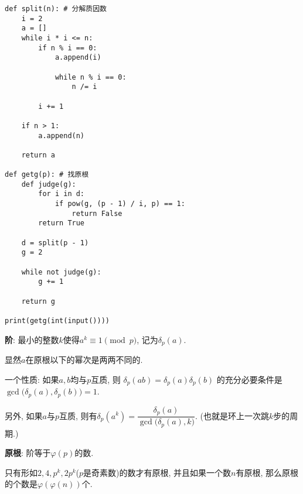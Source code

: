 \begin{verbatim}
def split(n): # 分解质因数
    i = 2
    a = []
    while i * i <= n:
        if n % i == 0:
            a.append(i)

            while n % i == 0:
                n /= i

        i += 1

    if n > 1:
        a.append(n)

    return a
    
def getg(p): # 找原根
    def judge(g):
        for i in d:
            if pow(g, (p - 1) / i, p) == 1:
                return False
        return True

    d = split(p - 1)
    g = 2

    while not judge(g):
        g += 1

    return g

print(getg(int(input())))
\end{verbatim}

\textbf{阶}: 最小的整数$k$使得$a ^ k \equiv 1 \pmod p$, 记为$\delta_p(a)$.

显然$a$在原根以下的幂次是两两不同的.

一个性质: 如果$a, b$均与$p$互质, 则 $ \delta_p(ab)=\delta_p(a)\delta_p(b) $ 的充分必要条件是$ \gcd\big(\delta_p(a),\delta_p(b)\big)=1 $.

另外, 如果$a$与$p$互质, 则有$ \delta_p(a^k)=\dfrac{\delta_p(a)}{\gcd\big(\delta_p(a),k\big)} $. (也就是环上一次跳$k$步的周期.)

\textbf{原根}: 阶等于$\varphi(p)$的数.

只有形如$2, 4, p ^ k, 2 p ^ k$($p$是奇素数)的数才有原根, 并且如果一个数$n$有原根, 那么原根的个数是$\varphi(\varphi(n))$个.